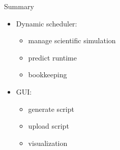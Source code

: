\begin{frame}{Summary}
	\begin{itemize}
		\pause
		\item Dynamic scheduler:
		\begin{itemize}
			\pause
			\item manage scientific simulation
			\pause
			\item predict runtime
			\pause
			\item bookkeeping
		\end{itemize}
		\pause
		\item GUI:
		\begin{itemize}
			\pause
			\item generate script
			\pause
			\item upload script
			\pause
			\item visualization
		\end{itemize}
	\end{itemize}
\end{frame}
